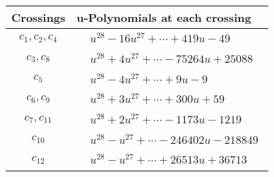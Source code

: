 \documentclass[1p]{elsarticle_modified}
\theoremstyle{definition}
\begin{document}
\begin{tabular}{m{50pt}|m{274pt}}
Crossings & \hspace{64pt}u-Polynomials at each crossing \\
\hline $$\begin{aligned}c_{1},c_{2},c_{4}\end{aligned}$$&$\begin{aligned}
&u^{28}-16 u^{27}+\cdots+419 u-49
\end{aligned}$\\
\hline $$\begin{aligned}c_{3},c_{8}\end{aligned}$$&$\begin{aligned}
&u^{28}+4 u^{27}+\cdots-75264 u+25088
\end{aligned}$\\
\hline $$\begin{aligned}c_{5}\end{aligned}$$&$\begin{aligned}
&u^{28}-4 u^{27}+\cdots+9 u-9
\end{aligned}$\\
\hline $$\begin{aligned}c_{6},c_{9}\end{aligned}$$&$\begin{aligned}
&u^{28}+3 u^{27}+\cdots+300 u+59
\end{aligned}$\\
\hline $$\begin{aligned}c_{7},c_{11}\end{aligned}$$&$\begin{aligned}
&u^{28}+2 u^{27}+\cdots-1173 u-1219
\end{aligned}$\\
\hline $$\begin{aligned}c_{10}\end{aligned}$$&$\begin{aligned}
&u^{28}- u^{27}+\cdots-246402 u-218849
\end{aligned}$\\
\hline $$\begin{aligned}c_{12}\end{aligned}$$&$\begin{aligned}
&u^{28}- u^{27}+\cdots+26513 u+36713
\end{aligned}$\\
\hline
\end{tabular}\\~\\
\newpage\renewcommand{\arraystretch}{1}
\end{document}
